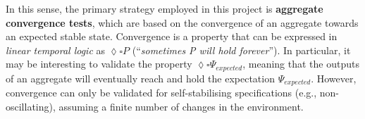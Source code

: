 In this sense, the primary strategy employed in this project is
\textbf{aggregate convergence tests}, which are based on the convergence of an
aggregate towards an expected stable state. Convergence is a property that can
be expressed in \textit{linear temporal logic} as $\lozenge \square P$
(\enquote{\textit{sometimes P will hold forever}}). In particular, it may be
interesting to validate the property $\lozenge \square \Psi_{expected}$,
meaning that the outputs of an aggregate will eventually reach and hold the
expectation $\Psi_{expected}$. However, convergence can only be validated for
self-stabilising specifications (e.g., non-oscillating), assuming a finite
number of changes in the environment.
